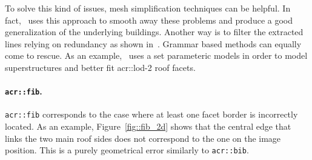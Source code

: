                 To solve this kind of issues, mesh simplification techniques can be helpful.
                In fact,~\textcite{verdie2015lod} uses this approach to smooth away these problems and produce a good generalization of the underlying buildings.
                Another way is to filter the extracted lines relying on redundancy as shown in~\textcite{michelin2013quality}.
                Grammar based methods can equally come to rescue.
                As an example,~\textcite{bredif20073d} uses a set parameteric models in order to model superstructures and better fit \gls{acr::lod}-2 roof facets.

            \paragraph{\texttt{\acrlong*{acr::fib}}.}
                \texttt{\gls{acr::fib}} corresponds to the case where at least one facet border is incorrectly located.
                As an example, Figure~\ref{fig::fib_2d} shows that the central edge that links the two main roof sides does not correspond to the one on the image position.
                This is a purely geometrical error similarly to \texttt{\gls{acr::bib}}.\\

                \begin{figure}[htb]
                    \centering
                \end{figure}

